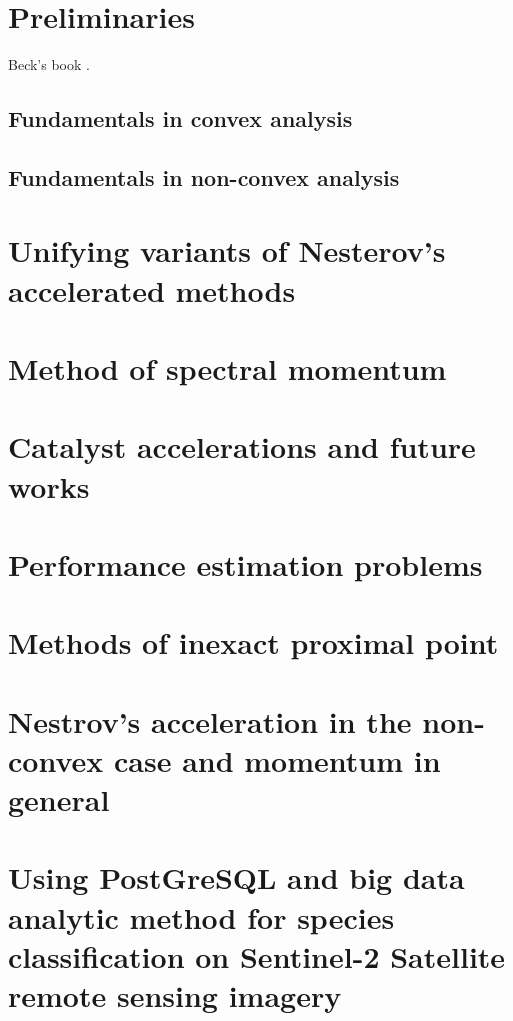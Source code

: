 \documentclass[12pt]{article}
\begin{document}
    
\section{Preliminaries}
    Beck's book \cite{beck_first-order_2017}. 
    \subsection{Fundamentals in convex analysis}
    \subsection{Fundamentals in non-convex analysis}

\section{Unifying variants of Nesterov's accelerated methods}\label{sec:unify-nes-acceleration}

\section{Method of spectral momentum}\label{sec:spectral-momentum}

\section{Catalyst accelerations and future works}\label{sec:catalyst}

\section{Performance estimation problems}\label{sec:pep}

\section{Methods of inexact proximal point}\label{sec:inexact-prox}

\section{Nestrov's acceleration in the non-convex case and momentum in general}\label{sec:nes-acc-ncnvx}

\section{Using PostGreSQL and big data analytic method for species classification on Sentinel-2 Satellite remote sensing imagery}




\newpage

\appendix
\end{document}
